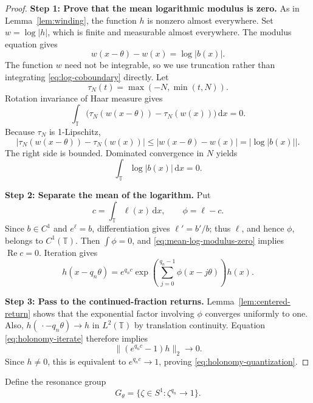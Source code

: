 \documentclass[reqno]{amsart}
\theoremstyle{remark}
\numberwithin{equation}{section}
\newcommand{\T}{\mathbb{T}}
\newcommand{\dd}{\,\mathrm{d}}
\begin{document}
\begin{proof}
\textbf{Step 1: Prove that the mean logarithmic modulus is zero.}
As in Lemma~\ref{lem:winding}, the function \(h\) is nonzero almost
everywhere. Set \(w=\log|h|\), which is finite and measurable almost
everywhere. The modulus equation gives
\begin{equation}
  w(x-\theta)-w(x)=\log|b(x)|.
  \label{eq:log-coboundary}
\end{equation}
The function \(w\) need not be integrable, so we use truncation rather than
integrating \eqref{eq:log-coboundary} directly. Let
\[
  \tau_N(t)=\max(-N,\min(t,N)).
\]
Rotation invariance of Haar measure gives
\[
  \int_\T\bigl(\tau_N(w(x-\theta))-\tau_N(w(x))\bigr)\dd x=0.
\]
Because \(\tau_N\) is 1-Lipschitz,
\[
  |\tau_N(w(x-\theta))-\tau_N(w(x))|
  \leq|w(x-\theta)-w(x)|=|\log|b(x)||.
\]
The right side is bounded. Dominated convergence in \(N\) yields
\begin{equation}
  \int_\T\log|b(x)|\dd x=0.
  \label{eq:mean-log-modulus-zero}
\end{equation}

\smallskip
\noindent
\textbf{Step 2: Separate the mean of the logarithm.}
Put
\[
  c=\int_\T\ell(x)\dd x,
  \qquad
  \phi=\ell-c.
\]
Since \(b\in C^1\) and \(e^\ell=b\), differentiation gives
\(\ell'=b'/b\); thus \(\ell\), and hence \(\phi\), belongs to \(C^1(\T)\).
Then \(\int\phi=0\), and \eqref{eq:mean-log-modulus-zero} implies
\(\operatorname{Re}c=0\). Iteration gives
\begin{equation}
  h(x-q_n\theta)
  =e^{q_nc}
   \exp\left(
     \sum_{j=0}^{q_n-1}\phi(x-j\theta)
   \right)h(x).
  \label{eq:holonomy-iterate}
\end{equation}

\smallskip
\noindent
\textbf{Step 3: Pass to the continued-fraction returns.}
Lemma~\ref{lem:centered-return} shows that the exponential factor involving
\(\phi\) converges uniformly to one. Also,
\(h(\,\cdot-q_n\theta)\to h\) in \(L^2(\T)\) by translation continuity.
Equation \eqref{eq:holonomy-iterate} therefore implies
\[
  \|(e^{q_nc}-1)h\|_2\longrightarrow0.
\]
Since \(h\neq0\), this is equivalent to \(e^{q_nc}\to1\), proving
\eqref{eq:holonomy-quantization}.
\end{proof}

Define the resonance group
\begin{equation}
  G_\theta
  =\{\zeta\in S^1:\zeta^{q_n}\to1\}.
  \label{eq:resonance-group}
\end{equation}
\end{document}
